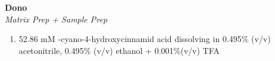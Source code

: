 \textbf{Dono} 
\\
\textit{Matrix Prep + Sample Prep}
\begin{enumerate}
\item{52.86 mM \alpha-cyano-4-hydroxycinnamid acid dissolving in 0.495\% (v/v) acetonitrile, 0.495\% (v/v) ethanol + 0.001\%(v/v) TFA}
\tem
\end{enumerate}
